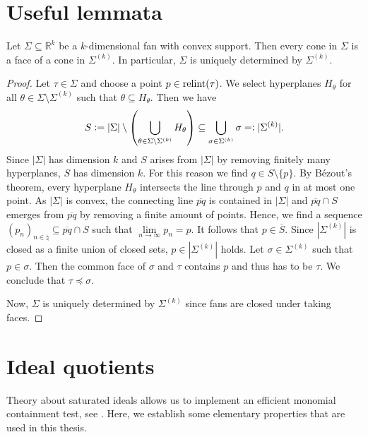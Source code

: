 \chapter{Useful lemmata}

\begin{lemmaApp}
	\label{lemma:convex_fan_maximal_cones}
	Let $\Sigma\subseteq\mathbb{R}^k$ be a $k$-dimensional fan with convex support. Then every cone in $\Sigma$ is a face of a cone in $\Sigma^{(k)}$. In particular, $\Sigma$ is uniquely determined by $\Sigma^{(k)}$.
\end{lemmaApp}
\begin{proof}
	Let $\tau\in\Sigma$ and choose a point $p\in\text{relint}(\tau)$. We select hyperplanes $H_\theta$ for all $\theta\in\Sigma\setminus\Sigma^{(k)}$ such that $\theta\subseteq H_\theta$. Then we have
	$$S \mathrel{\mathop:}= |\Sigma| \setminus \left(\bigcup_{\theta\in\Sigma\setminus\Sigma^{(k)}} H_\theta\right) \subseteq \bigcup_{\sigma\in\Sigma^{(k)}} \sigma =\mathrel{\mathop:} |\Sigma^{(k)}|.$$
	Since $|\Sigma|$ has dimension $k$ and $S$ arises from $|\Sigma|$ by removing finitely many hyperplanes, $S$ has dimension $k$. For this reason we find $q\in S \setminus\{p\}$. By Bézout's theorem, every hyperplane $H_\theta$ intersects the line through $p$ and $q$ in at most one point. As $|\Sigma|$ is convex, the connecting line $\overline{pq}$ is contained in $|\Sigma|$ and $\overline{pq} \cap S$ emerges from $\overline{pq}$ by removing a finite amount of points. Hence, we find a sequence $(p_n)_{n\in\natural}\subseteq \overline{pq} \cap S$ such that $\lim\limits_{n\rightarrow\infty} p_n = p$. It follows that $p\in\overline{S}$. Since $|\Sigma^{(k)}|$ is closed as a finite union of closed sets, $p\in|\Sigma^{(k)}|$ holds. Let $\sigma\in\Sigma^{(k)}$ such that $p\in\sigma$. Then the common face of $\sigma$ and $\tau$ contains $p$ and thus has to be $\tau$. We conclude that $\tau\preceq\sigma$.
	
	Now, $\Sigma$ is uniquely determined by $\Sigma^{(k)}$ since fans are closed under taking faces.
\end{proof}

\chapter{Ideal quotients}
\label{appendix:ideal_quotients}

Theory about saturated ideals allows us to implement an efficient monomial containment test, see \cite{gitfan_symmetry}. Here, we establish some elementary properties that are used in this thesis.


